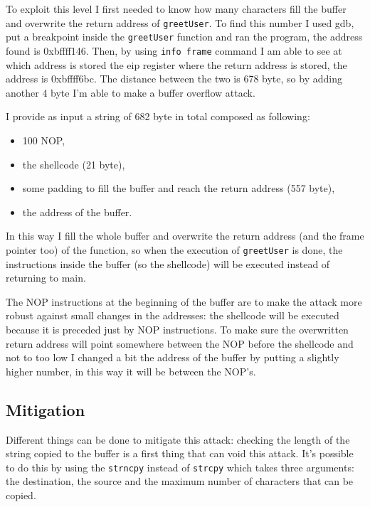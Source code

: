 \documentclass[a4paper,12pt]{article}
\begin{document}
To exploit this level I first needed to know how many characters fill the buffer and overwrite the return address of \texttt{greetUser}. To find this number I used gdb, put a breakpoint inside the \texttt{greetUser} function and ran the program, the address found is 0xbffff146. Then, by using \texttt{info frame} command I am able to see at which address is stored the eip register where the return address is stored, the address is 0xbffff6bc. The distance between the two is 678 byte, so by adding another 4 byte I'm able to make a buffer overflow attack.

I provide as input a string of 682 byte in total composed as following:
\begin{itemize}
\item 100 NOP,
\item the shellcode (21 byte),
\item some padding to fill the buffer and reach the return address (557 byte),
\item the address of the buffer.
\end{itemize}


In this way I fill the whole buffer and overwrite the return address (and the frame pointer too) of the function, so when the execution of \texttt{greetUser} is done, the instructions inside the buffer (so the shellcode) will be executed instead of returning to main. 

The NOP instructions at the beginning of the buffer are to make the attack more robust against small changes in the addresses: the shellcode will be executed because it is preceded just by NOP instructions. To make sure the overwritten return address will point somewhere between the NOP before the shellcode and not to too low I changed a bit the address of the buffer by putting a slightly higher number, in this way it will be between the NOP's.


\subsection{Mitigation}

Different things can be done to mitigate this attack: checking the length of the string copied to the buffer is a first thing that can void this attack. It's possible to do this by using the \texttt{strncpy} instead of \texttt{strcpy} which takes three arguments: the destination, the source and the maximum number of characters that can be copied.
\end{document}
